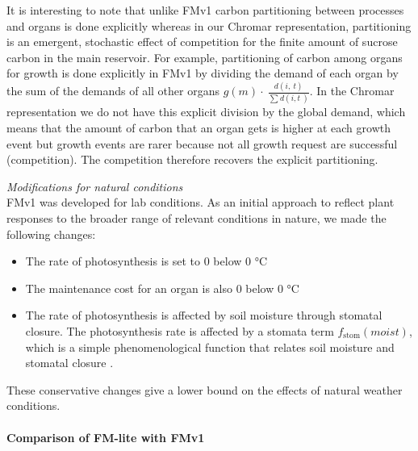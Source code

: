 \documentclass[phd]{infthesis}
\newcommand{\mr}[1]{\mathrm{#1}}
\begin{document}
It is interesting to note that unlike FMv1 carbon partitioning between
processes and organs is done explicitly whereas in our Chromar
representation, partitioning is an emergent, stochastic effect of
competition for the finite amount of sucrose carbon in the main
reservoir. For example, partitioning of carbon among organs for growth
is done explicitly in FMv1 by dividing the demand of each organ by the
sum of the demands of all other organs
\(g( m ) \cdot \ \frac{d(i,\ t)}{\sum_{}^{}{d(i,t\ )}}\). In
the Chromar representation we do not have this explicit division by the
global demand, which means that the amount of carbon that an organ gets
is higher at each growth event but growth events are rarer because not
all growth request are successful (competition). The competition
therefore recovers the explicit partitioning.

\emph{Modifications for natural conditions}\\
FMv1 was developed for lab conditions. As an initial approach to reflect
plant responses to the broader range of relevant conditions in nature,
we made the following changes:

\begin{itemize}
\item
  The rate of photosynthesis is set to 0 below 0 °C
\item
  The maintenance cost for an organ is also 0 below 0 °C
\item
  The rate of photosynthesis is affected by soil moisture through
  stomatal closure. The photosynthesis rate is affected by a stomata
  term \(f_{\mr{stom}}(moist)\), which is a simple phenomenological
  function that relates soil moisture and stomatal closure \citep{france_mathematical_1984}.
\end{itemize}

These conservative changes give a lower bound on the effects of natural
weather conditions.

\paragraph{Comparison of FM-lite with
  FMv1}
\label{comparison-of-fm-lite-with-fmv1}
\end{document}
